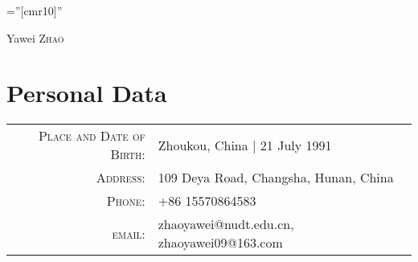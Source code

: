 \documentclass[a4paper,10pt]{article}
\begin{document}

\pagestyle{empty} %

\font\fb=''[cmr10]'' %

\par{\centering
		{\Huge Yawei \textsc{Zhao}
	}\bigskip\par}

\section{Personal Data}

\begin{tabular}{rl}
    \textsc{Place and Date of Birth:} & Zhoukou, China  | 21 July 1991 \\
    \textsc{Address:}   & 109 Deya Road, Changsha, Hunan, China \\
    \textsc{Phone:}     & +86 15570864583\\
    \textsc{email:}     &  zhaoyawei@nudt.edu.cn, zhaoyawei09@163.com
\end{tabular}
\end{document}
